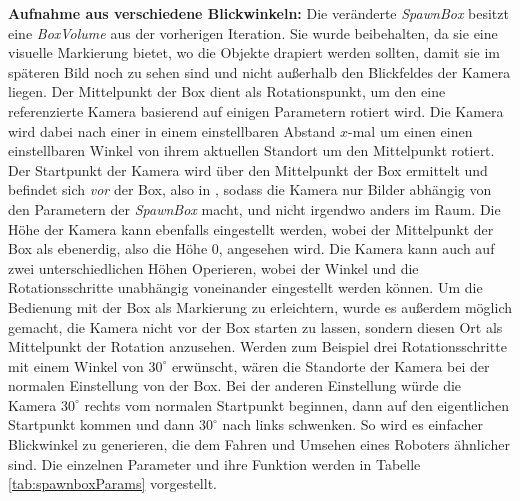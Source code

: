 \textbf{Aufnahme aus verschiedene Blickwinkeln:} Die veränderte \textit{SpawnBox} besitzt eine \textit{BoxVolume} aus der vorherigen Iteration. Sie wurde beibehalten, da sie eine visuelle Markierung bietet, wo die Objekte drapiert werden sollten, damit sie im späteren Bild noch zu sehen sind und nicht außerhalb den Blickfeldes der Kamera liegen. Der Mittelpunkt der Box dient als Rotationspunkt, um den eine referenzierte Kamera basierend auf einigen Parametern rotiert wird. Die Kamera wird dabei nach einer  in einem einstellbaren Abstand $x$-mal um einen einen einstellbaren Winkel von ihrem aktuellen Standort um den Mittelpunkt rotiert. Der Startpunkt der Kamera wird über den Mittelpunkt der Box ermittelt und befindet sich \textit{vor} der Box, also in , sodass die Kamera nur Bilder abhängig von den Parametern der \textit{SpawnBox} macht, und nicht irgendwo anders im Raum. Die Höhe der Kamera kann ebenfalls eingestellt werden, wobei der Mittelpunkt der Box als ebenerdig, also die Höhe 0, angesehen wird. Die Kamera kann auch auf zwei unterschiedlichen Höhen Operieren, wobei der Winkel und die Rotationsschritte unabhängig voneinander eingestellt werden können. Um die Bedienung mit der Box als Markierung zu erleichtern, wurde es außerdem möglich gemacht, die Kamera nicht vor der Box starten zu lassen, sondern diesen Ort als Mittelpunkt der Rotation anzusehen. Werden zum Beispiel drei Rotationsschritte mit einem Winkel von $30^\circ$ erwünscht, wären die Standorte der Kamera bei der normalen Einstellung  von der Box. Bei der anderen Einstellung würde die Kamera $30^\circ$ rechts vom normalen Startpunkt beginnen, dann auf den eigentlichen Startpunkt kommen und dann $30^\circ$ nach links schwenken. So wird es einfacher Blickwinkel zu generieren, die dem Fahren und Umsehen eines Roboters ähnlicher sind.  \newline
Die einzelnen Parameter und ihre Funktion werden in Tabelle \ref{tab:spawnboxParams} vorgestellt.

